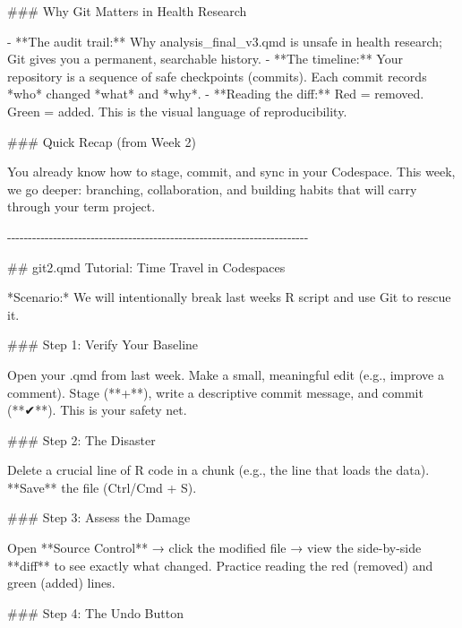 \documentclass[
  letterpaper,
  DIV=11,
  numbers=noendperiod,
  oneside]{scrreprt}
\newenvironment{Shaded}{\begin{snugshade}}{\end{snugshade}}
\newcommand{\FunctionTok}[1]{\textcolor[rgb]{0.28,0.35,0.67}{#1}}
\newcommand{\InformationTok}[1]{\textcolor[rgb]{0.37,0.37,0.37}{#1}}
\newcommand{\NormalTok}[1]{\textcolor[rgb]{0.00,0.23,0.31}{#1}}
\newcommand{\SpecialStringTok}[1]{\textcolor[rgb]{0.13,0.47,0.30}{#1}}
\begin{document}
\begin{Shaded}
\begin{Highlighting}[numbers=left,,]
\FunctionTok{\#\#\# Why Git Matters in Health Research}

\SpecialStringTok{{-}   }\NormalTok{**The audit trail:** Why }\InformationTok{\textasciigrave{}analysis\_final\_v3.qmd\textasciigrave{}}\NormalTok{ is unsafe in health research; Git gives you a permanent, searchable history.}
\SpecialStringTok{{-}   }\NormalTok{**The timeline:** Your repository is a sequence of safe checkpoints (commits). Each commit records *who* changed *what* and *why*.}
\SpecialStringTok{{-}   }\NormalTok{**Reading the diff:** Red = removed. Green = added. This is the visual language of reproducibility.}

\FunctionTok{\#\#\# Quick Recap (from Week 2)}

\NormalTok{You already know how to stage, commit, and sync in your Codespace. This week, we go deeper: branching, collaboration, and building habits that will carry through your term project.}

\NormalTok{{-}{-}{-}{-}{-}{-}{-}{-}{-}{-}{-}{-}{-}{-}{-}{-}{-}{-}{-}{-}{-}{-}{-}{-}{-}{-}{-}{-}{-}{-}{-}{-}{-}{-}{-}{-}{-}{-}{-}{-}{-}{-}{-}{-}{-}{-}{-}{-}{-}{-}{-}{-}{-}{-}{-}{-}{-}{-}{-}{-}{-}{-}{-}{-}{-}{-}{-}{-}{-}{-}{-}{-}}

\FunctionTok{\#\# \textasciigrave{}git2.qmd\textasciigrave{} Tutorial: Time Travel in Codespaces}

\NormalTok{*Scenario:* We will intentionally break last week\textquotesingle{}s R script and use Git to rescue it.}

\FunctionTok{\#\#\# Step 1: Verify Your Baseline}

\NormalTok{Open your }\InformationTok{\textasciigrave{}.qmd\textasciigrave{}}\NormalTok{ from last week. Make a small, meaningful edit (e.g., improve a comment). Stage (**+**), write a descriptive commit message, and commit (**✔**). This is your safety net.}

\FunctionTok{\#\#\# Step 2: The Disaster}

\NormalTok{Delete a crucial line of R code in a chunk (e.g., the line that loads the data). **Save** the file (Ctrl/Cmd + S).}

\FunctionTok{\#\#\# Step 3: Assess the Damage}

\NormalTok{Open **Source Control** → click the modified file → view the side{-}by{-}side **diff** to see exactly what changed. Practice reading the red (removed) and green (added) lines.}

\FunctionTok{\#\#\# Step 4: The Undo Button}


\end{Highlighting}
\end{Shaded}
\end{document}
